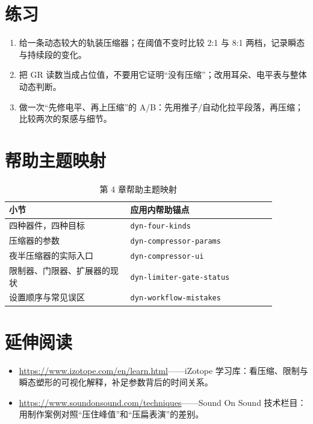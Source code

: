 \section{练习}


\begin{exercise}
\begin{enumerate}
  \item 给一条动态较大的轨装压缩器；在阈值不变时比较 2:1 与 8:1 两档，记录瞬态与持续段的变化。
  \item 把 GR 读数当成占位值，不要用它证明“没有压缩”；改用耳朵、电平表与整体动态判断。
  \item 做一次“先修电平、再上压缩”的 A/B：先用推子/自动化拉平段落，再压缩；比较两次的泵感与细节。
\end{enumerate}
\end{exercise}

\section{帮助主题映射}

\begin{table}[htbp]
\centering
\small
\begin{tabular}{@{}p{0.40\linewidth}p{0.48\linewidth}@{}}
\hline
小节 & 应用内帮助锚点 \\
\hline
四种器件，四种目标 & \texttt{dyn-four-kinds} \\
压缩器的参数 & \texttt{dyn-compressor-params} \\
夜半压缩器的实际入口 & \texttt{dyn-compressor-ui} \\
限制器、门限器、扩展器的现状 & \texttt{dyn-limiter-gate-status} \\
设置顺序与常见误区 & \texttt{dyn-workflow-mistakes} \\
\hline
\end{tabular}
\caption{第 4 章帮助主题映射}
\end{table}

\section*{延伸阅读}
\begin{itemize}[leftmargin=1.5em]
\item \url{https://www.izotope.com/en/learn.html}——iZotope 学习库：看压缩、限制与瞬态塑形的可视化解释，补足参数背后的时间关系。
\item \url{https://www.soundonsound.com/techniques}——Sound On Sound 技术栏目：用制作案例对照“压住峰值”和“压扁表演”的差别。
\end{itemize}
